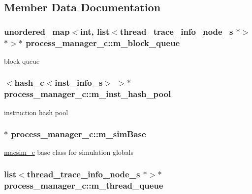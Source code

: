 \subsection{Member Data Documentation}
\hypertarget{classprocess__manager__c_a07f5bef183ba3a7f15ed362c562c1137}{
\subsubsection[{m\_\-block\_\-queue}]{\setlength{\rightskip}{0pt plus 5cm}unordered\_\-map$<$int, list$<${\bf thread\_\-trace\_\-info\_\-node\_\-s} $\ast$$>$ $\ast$$>$$\ast$ {\bf process\_\-manager\_\-c::m\_\-block\_\-queue}}}
\label{classprocess__manager__c_a07f5bef183ba3a7f15ed362c562c1137}
block queue \hypertarget{classprocess__manager__c_ae5ef36e1434826d79d370c9afcb174bc}{
\subsubsection[{m\_\-inst\_\-hash\_\-pool}]{$<${\bf hash\_\-c}$<${\bf inst\_\-info\_\-s}$>$ $>$$\ast$ {\bf process\_\-manager\_\-c::m\_\-inst\_\-hash\_\-pool}}}
\label{classprocess__manager__c_ae5ef36e1434826d79d370c9afcb174bc}
instruction hash pool \hypertarget{classprocess__manager__c_a6cca65c36ed2b7747dd13857fcce6ee9}{
\subsubsection[{m\_\-simBase}]{$\ast$ {\bf process\_\-manager\_\-c::m\_\-simBase}}}
\label{classprocess__manager__c_a6cca65c36ed2b7747dd13857fcce6ee9}
\hyperlink{classmacsim__c}{macsim\_\-c} base class for simulation globals \hypertarget{classprocess__manager__c_a0fa9dc97ed1a88aadc63b0a82ef24896}{
\subsubsection[{m\_\-thread\_\-queue}]{\setlength{\rightskip}{0pt plus 5cm}list$<${\bf thread\_\-trace\_\-info\_\-node\_\-s} $\ast$$>$$\ast$ {\bf process\_\-manager\_\-c::m\_\-thread\_\-queue}}}
